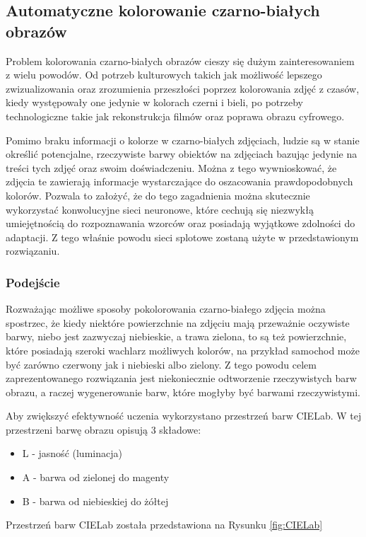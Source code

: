 \subsection[Automatyczne kolorowanie czarno-białych obrazów (Bartosz Bieliński)]{Automatyczne kolorowanie czarno-białych obrazów}
\label{image_colorization}

  Problem kolorowania czarno-białych obrazów cieszy się dużym zainteresowaniem z
  wielu powodów. Od potrzeb kulturowych takich jak możliwość lepszego
  zwizualizowania oraz zrozumienia przeszłości poprzez kolorowania zdjęć z
  czasów, kiedy występowały one jedynie w kolorach czerni i bieli, po potrzeby
  technologiczne takie jak rekonstrukcja filmów oraz poprawa obrazu cyfrowego.

  Pomimo braku informacji o kolorze w czarno-białych zdjęciach, ludzie są w
  stanie określić potencjalne, rzeczywiste barwy obiektów na zdjęciach bazując jedynie
  na treści tych zdjęć oraz swoim doświadczeniu. Można z tego wywnioskować, że
  zdjęcia te zawierają informacje wystarczające do oszacowania prawdopodobnych
  kolorów. Pozwala to założyć, że do tego zagadnienia można skutecznie wykorzystać
  konwolucyjne sieci neuronowe, które cechują się niezwykłą umiejętnością do
  rozpoznawania wzorców oraz posiadają wyjątkowe zdolności do adaptacji. Z tego
  właśnie powodu sieci splotowe zostaną użyte w przedstawionym rozwiązaniu.

\subsubsection{Podejście}

  Rozważając możliwe sposoby pokolorowania czarno-białego zdjęcia można spostrzec,
  że kiedy niektóre powierzchnie na zdjęciu mają przeważnie oczywiste barwy, niebo
  jest zazwyczaj niebieskie, a trawa zielona, to są też powierzchnie, które
  posiadają szeroki wachlarz możliwych kolorów, na przykład samochod może być
  zarówno czerwony jak i niebieski albo zielony. Z tego powodu celem zaprezentowanego
  rozwiązania jest niekoniecznie odtworzenie rzeczywistych barw obrazu, a raczej
  wygenerowanie barw, które mogłyby być barwami rzeczywistymi.

  Aby zwiększyć efektywność uczenia wykorzystano przestrzeń barw CIELab. W tej
  przestrzeni barwę obrazu opisują 3 składowe:
  \begin{itemize}
  \item L - jasność (luminacja)
  \item A - barwa od zielonej do magenty
  \item B - barwa od niebieskiej do żółtej
  \end{itemize}
  Przestrzeń barw CIELab została przedstawiona na Rysunku \ref{fig:CIELab}

